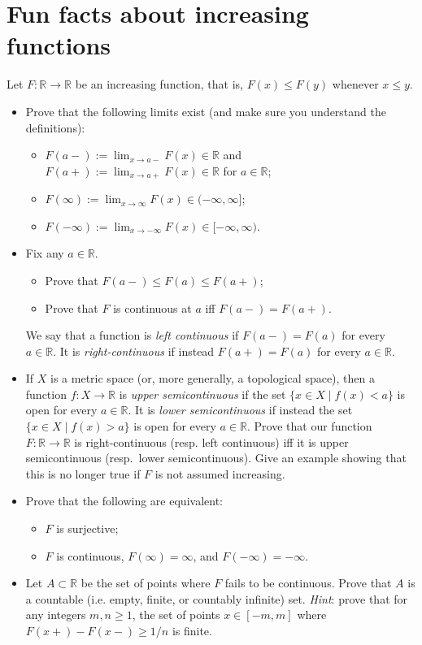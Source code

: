 \documentclass[lang=cn,11pt]{elegantbook}
\begin{document}
\section{Fun facts about increasing functions}
    Let $F\colon\mathbb{R}\to\mathbb{R}$ be an increasing function, that is, $F(x)\le F(y)$ whenever $x\le y$. 
    \begin{itemize}
    \item[(a)]
      Prove that the following limits exist (and make sure you understand the definitions):
      \begin{itemize}
      \item[(i)]
        $F(a-):=\lim_{x\to a-}F(x)\in\mathbb{R}$ and $F(a+):=\lim_{x\to a+}F(x)\in\mathbb{R}$ for $a\in\mathbb{R}$;
      \item[(ii)]
        $F(\infty):=\lim_{x\to\infty}F(x)\in(-\infty,\infty]$;
      \item[(iii)]
        $F(-\infty):=\lim_{x\to-\infty}F(x)\in[-\infty,\infty)$.
      \end{itemize}
    \item[(b)]
      Fix any $a\in\mathbb{R}$.
      \begin{itemize}
      \item[(i)]
        Prove that $F(a-)\le F(a)\le F(a+)$;
      \item[(ii)]
        Prove that $F$ is continuous at $a$ iff $F(a-)=F(a+)$.
      \end{itemize}
      We say that a function is \emph{left continuous} if $F(a-)=F(a)$ for every $a\in\mathbb{R}$. It is \emph{right-continuous} if instead $F(a+)=F(a)$ for every $a\in\mathbb{R}$.
    \item[(c)]
      If $X$ is a metric space (or, more generally, a topological space), then a function $f\colon X\to\mathbb{R}$ is \emph{upper semicontinuous} if the set $\{x\in X\mid f(x)<a\}$ is open for every $a\in\mathbb{R}$. It is \emph{lower semicontinuous} if instead the set $\{x\in X\mid f(x)>a\}$ is open for every $a\in\mathbb{R}$.
      Prove that our function $F\colon\mathbb{R}\to\mathbb{R}$ is right-continuous (resp. left continuous) iff it is upper semicontinuous (resp.\ lower semicontinuous). Give an example showing that this is no longer true if $F$ is not assumed increasing.
  \item[(d)]
    Prove that the following are equivalent:
    \begin{itemize}
    \item[(i)]
      $F$ is surjective;
    \item[(ii)]
      $F$ is continuous, $F(\infty)=\infty$, and $F(-\infty)=-\infty$.
    \end{itemize}
  \item[(e)]
    Let $A\subset\mathbb{R}$ be the set of points where $F$ fails to be continuous. Prove that $A$ is a countable  (i.e. empty, finite, or countably infinite) set. \textit{Hint}: prove that for any integers $m,n\ge 1$, the set of points $x\in[-m,m]$ where $F(x+)-F(x-)\ge 1/n$ is finite.
  \end{itemize}
\end{document}
